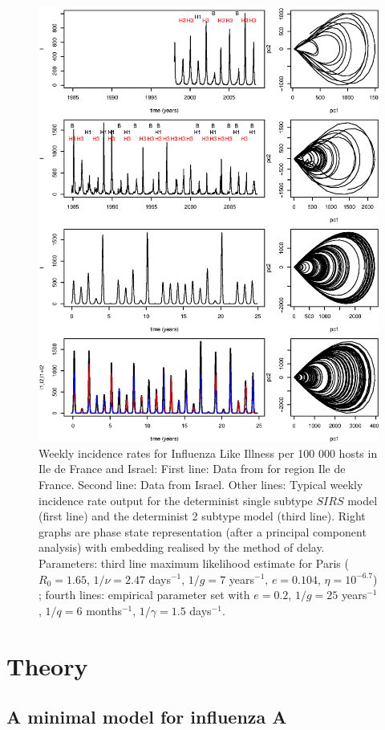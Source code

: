 \documentclass[12pt]{article}
\begin{document}
\begin{figure}[htb]
  \center
  \includegraphics[width= 0.8 \linewidth]{graph/all_reconstructed_bernard.eps}
  \caption{Weekly incidence rates for Influenza Like Illness
    per 100 000 hosts in Ile de France and Israel:
    First line: Data from for region Ile de France. 
    Second line: Data from Israel.
    Other lines: Typical weekly incidence rate output for the
    determinist single subtype $SIRS$ model (first line) and the
    determinist 2 subtype model (third line).
    Right graphs are phase state representation (after a principal
    component analysis)  with embedding realised by the method of delay.
    Parameters: third line maximum likelihood estimate for Paris
    ($R_0=1.65$, $1/\nu=2.47$ days$^{-1}$, $1/g=7$ years$^{-1}$,
    $e=0.104$, $\eta=10^{-6.7}$) ; fourth lines: empirical parameter
    set with $e=0.2$, $1/g=25$ years$^{-1}$, $1/q=6$ months$^{-1}$,
    $1/ \gamma=1.5$ days$^{-1}$.}
  \label{fig:attractor}
\end{figure}


\section{Theory}
\label{sec:theory}

\subsection{A minimal model for influenza A}
\label{sec:model}
\end{document}
